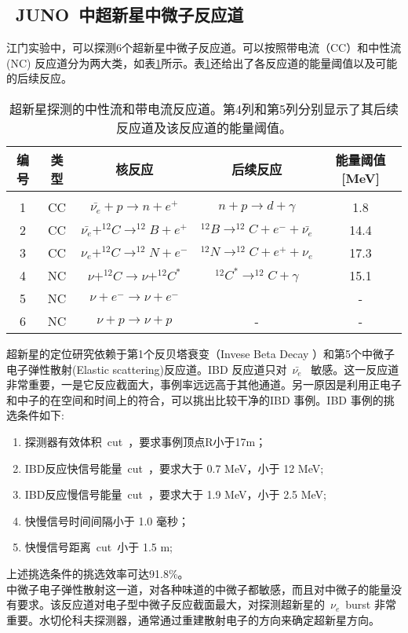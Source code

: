 \subsection{~JUNO~中超新星中微子反应道}
江门实验中，可以探测6个超新星中微子反应道。可以按照带电流（CC）和中性流(NC) 反应道分为两大类，如表\ref{tab:t61}所示。表\ref{tab:t61}还给出了各反应道的能量阈值以及可能的后续反应。
\begin{table}[htbp]
\centering  %
\begin{tabular}{ccccc}  %
\hline
 编号&类型 &核反应 &后续反应 &能量阈值[MeV] \\ \hline  %
\\   1& CC & $ \bar{\nu_{e}}  + p \rightarrow n + e^{+} $  & $ n+p \rightarrow d + \gamma $ &1.8%
\\   2& CC& $ \bar{\nu_{e}}   +^{12}C \rightarrow ^{12}B+e^{+} $ & $^{12}B\rightarrow^{12}C+e^{-}+ \bar{\nu_{e}}$ &14.4%
\\   3&CC & $ \nu_{e}+^{12}C \rightarrow ^{12}N+e^{-}$ &  $^{12}N\rightarrow^{12}C+e^{+}+ \nu_{e}$   &17.3%
\\   4& NC&$\nu+^{12}C \rightarrow \nu+ ^{12}C^{*}$ &  $^{12}C^{*}\rightarrow^{12}C+\gamma  $&15.1%
\\   5& NC&$\nu+e^{-} \rightarrow \nu+e^{-}$& \text{-} &-%
\\   6& NC& $\nu+p \rightarrow \nu+p $ & - &-%
\\ \hline
\end{tabular}
\caption{超新星探测的中性流和带电流反应道。第4列和第5列分别显示了其后续反应道及该反应道的能量阈值。}
\label{tab:t61}
\end{table}
超新星的定位研究依赖于第1个反贝塔衰变（Invese Beta Decay ）和第5个中微子电子弹性散射(Elastic scattering)反应道。IBD 反应道只对~$\bar{\nu_{e}}$~ 敏感。这一反应道非常重要，一是它反应截面大，事例率远远高于其他通道。另一原因是利用正电子和中子的在空间和时间上的符合，可以挑出比较干净的IBD 事例。IBD 事例的挑选条件如下\citep{an2015neutrino}:
\begin{enumerate}
\item 探测器有效体积~cut~，要求事例顶点R小于17m；
\item IBD反应快信号能量~cut~，要求大于 0.7 MeV，小于 12 MeV;
\item IBD反应慢信号能量~cut~，要求大于 1.9 MeV，小于 2.5 MeV;
\item 快慢信号时间间隔小于 1.0 毫秒；
\item 快慢信号距离~cut~小于 1.5 m;
\end{enumerate}
上述挑选条件的挑选效率可达91.8\%。\\
中微子电子弹性散射这一道，对各种味道的中微子都敏感，而且对中微子的能量没有要求。该反应道对电子型中微子反应截面最大，对探测超新星的~$\nu_e$~burst 非常重要。水切伦科夫探测器，通常通过重建散射电子的方向来确定超新星方向。


